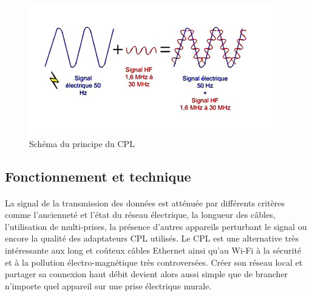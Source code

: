     \begin{figure}[h]
        \begin{center}
            \includegraphics[scale=0.7]{./images/cpl/principeCpl.jpg}
        \end{center}
            \caption{ Schéma du principe du CPL }
            \label{Principe du CPL}
    \end{figure}

        \subsection{Fonctionnement et technique}
            \paragraph{}
La signal de la transmission des données est atténuée par différents critères comme l’ancienneté et l'état du réseau électrique,
la longueur des câbles, l'utilisation de multi-prises, la présence d'autres appareils perturbant le signal ou encore la qualité des adaptateurs CPL utilisés.
Le CPL est une alternative très intéressante aux long et coûteux câbles Ethernet ainsi qu'au Wi-Fi à la sécurité et à la pollution électro-magnétique très controversées.
Créer son réseau local et partager sa connexion haut débit devient alors aussi simple que de brancher n'importe quel appareil sur une prise électrique murale.

